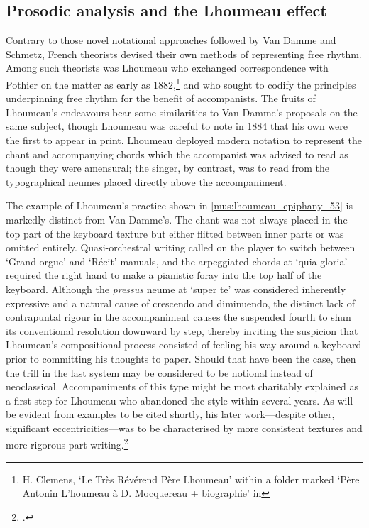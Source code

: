 \subsection{Prosodic analysis and the Lhoumeau effect}
\label{sc:lhoumeau_effect}%
Contrary to those novel notational approaches followed by Van Damme and Schmetz, French theorists devised their own methods of representing free rhythm.
Among such theorists was Lhoumeau who exchanged correspondence with Pothier on the matter as early as 1882,\footnote{H. Clemens, `Le Très Révérend Père Lhoumeau' within a folder marked `Père Antonin L'houmeau à D. Mocquereau + biographie' in \so{}} and who sought to codify the principles underpinning free rhythm for the benefit of accompanists.
The fruits of Lhoumeau's endeavours bear some similarities to Van Damme's proposals on the same subject, though Lhoumeau was careful to note in 1884 that his own were the first to appear in print.
Lhoumeau deployed modern notation to represent the chant and accompanying chords which the accompanist was advised to read as though they were amensural; the singer, by contrast, was to read from the typographical neumes placed directly above the accompaniment.

%
The example of Lhoumeau's practice shown in \cref{mus:lhoumeau_epiphany_53} is markedly distinct from Van Damme's.
The chant was not always placed in the top part of the keyboard texture but either flitted between inner parts or was omitted entirely.
Quasi-orchestral writing called on the player to switch between `Grand orgue' and `Récit' manuals, and the arpeggiated chords at `quia gloria' required the right hand to make a pianistic foray into the top half of the keyboard.
Although the \emph{pressus} neume at `super te' was considered inherently expressive and a natural cause of crescendo and diminuendo, the distinct lack of contrapuntal rigour in the accompaniment causes the suspended fourth to shun its conventional resolution downward by step, thereby inviting the suspicion that Lhoumeau's compositional process consisted of feeling his way around a keyboard prior to committing his thoughts to paper.
Should that have been the case, then the trill in the last system may be considered to be notional instead of neoclassical.
Accompaniments of this type might be most charitably explained as a first step for Lhoumeau who abandoned the style within several years.
As will be evident from examples to be cited shortly, his later work---despite other, significant eccentricities---was to be characterised by more consistent textures and more rigorous part-writing.\footcite[unpaginated preface, pp. 44, 48--9, 53--4, p.~87 n.~1]{Lhoumeauharmonisationmelodiesgregoriennes1884}

